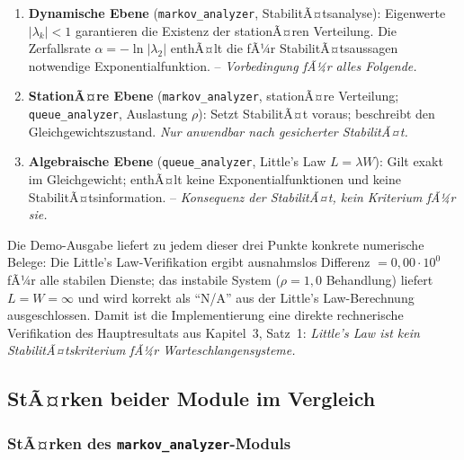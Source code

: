 ﻿\documentclass[a4paper,12pt]{scrreprt}
\theoremstyle{definition}
\begin{document}
\begin{enumerate}
	\item[-] \textbf{Dynamische Ebene} (\texttt{markov\_analyzer},
	StabilitÃ¤tsanalyse): Eigenwerte $|\lambda_k| < 1$ garantieren
	die Existenz der stationÃ¤ren Verteilung. Die Zerfallsrate
	$\alpha = -\ln|\lambda_2|$ enthÃ¤lt die fÃ¼r StabilitÃ¤tsaussagen
	notwendige Exponentialfunktion. -- \emph{Vorbedingung fÃ¼r alles Folgende.}
	
	\item[-] \textbf{StationÃ¤re Ebene} (\texttt{markov\_analyzer},
	stationÃ¤re Verteilung; \texttt{queue\_analyzer}, Auslastung $\rho$):
	Setzt StabilitÃ¤t voraus; beschreibt den Gleichgewichtszustand.
	\emph{Nur anwendbar nach gesicherter StabilitÃ¤t.}
	
	\item[-] \textbf{Algebraische Ebene} (\texttt{queue\_analyzer},
	Little's Law $L = \lambda W$): Gilt exakt im Gleichgewicht;
	enthÃ¤lt keine Exponentialfunktionen und keine StabilitÃ¤tsinformation.
	-- \emph{Konsequenz der StabilitÃ¤t, kein Kriterium fÃ¼r sie.}
\end{enumerate}

Die Demo-Ausgabe liefert zu jedem dieser drei Punkte konkrete numerische
Belege: Die Little's Law-Verifikation ergibt ausnahmslos Differenz
$= 0{,}00 \cdot 10^0$ fÃ¼r alle stabilen Dienste; das instabile System
($\rho = 1{,}0$ Behandlung) liefert $L = W = \infty$ und wird korrekt
als ``N/A'' aus der Little's Law-Berechnung ausgeschlossen.
Damit ist die Implementierung eine direkte rechnerische Verifikation
des Hauptresultats aus Kapitel~3, Satz~1: \emph{Little's Law
	ist kein StabilitÃ¤tskriterium fÃ¼r Warteschlangensysteme.}

\subsection{StÃ¤rken beider Module im Vergleich}
\label{sec:module-staerken}

\subsubsection{StÃ¤rken des \texttt{markov\_analyzer}-Moduls}
\end{document}
